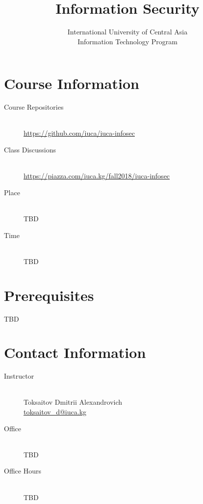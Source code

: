 \documentclass[12pt,a4paper,oneside]{article}
\begin{document}
    \title{Information Security}
    \author{
        International University of Central Asia\\
        Information Technology Program
    }
    \date{}
    \maketitle

    \section{Course Information}

        \begin{description}
            \item[Course Repositories]\hfill\\
                \url{https://github.com/iuca/iuca-infosec}
            \item[Class Discussions]\hfill\\
                \url{https://piazza.com/iuca.kg/fall2018/iuca-infosec}
            \item[Place]\hfill\\
                TBD
            \item[Time]\hfill\\
                TBD
        \end{description}

    \section{Prerequisites}

        TBD

    \section{Contact Information}

        \begin{description}
            \item[Instructor]\hfill\\
                Toksaitov Dmitrii Alexandrovich\\
                \href{mailto:toksaitov_d@iuca.kg}{toksaitov\_d@iuca.kg}
            \item[Office]\hfill\\
                TBD
            \item[Office Hours]\hfill\\
                TBD
        \end{description}
\end{document}
